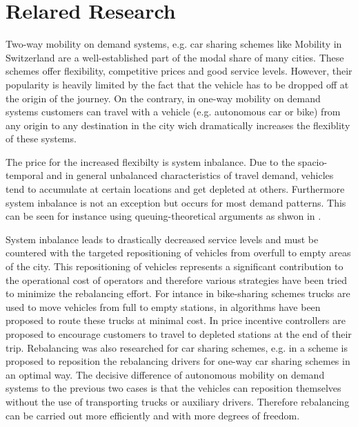 \section{Relared Research}
\label{subs:literatureResearch}

Two-way mobility on demand systems, e.g. car sharing schemes like Mobility in
Switzerland \citep{katzev2003car} are a well-established part of the modal share
of many cities. These schemes offer flexibility, competitive prices and good
service levels. However, their popularity is heavily limited by the fact that
the vehicle has to be dropped off at the origin of the journey. On the contrary,
in one-way mobility on demand systems customers can travel with a vehicle (e.g.
autonomous car or bike) from any origin to any destination in the city wich
dramatically increases the flexiblity of these systems.

The price for the increased flexibilty is system inbalance. Due to the
spacio-temporal and in general unbalanced characteristics of travel demand,
vehicles tend to accumulate at certain locations and get depleted at others.
Furthermore system inbalance is not an exception but occurs for most demand
patterns. This can be seen for instance using queuing-theoretical arguments
as shwon in \citep{zhang2016control}.

System inbalance leads to drastically decreased service levels and must be
countered with the targeted repositioning of vehicles from overfull to empty
areas of the city. This repositioning of vehicles represents a significant
contribution to the operational cost of operators and therefore various strategies
have been tried to minimize the rebalancing effort. For intance in bike-sharing
schemes trucks are used to move vehicles from full to empty stations, in
\citep{pfrommer2014dynamic} algorithms have been proposed to route these
trucks at minimal cost. In \citep{ruch2014rule} price incentive controllers
are proposed to encourage customers to travel to depleted stations at the end
of their trip. Rebalancing was also researched for car sharing schemes, e.g.
in \citep{smith2013rebalancing} a scheme is proposed to reposition the
rebalancing drivers for one-way car sharing schemes in an optimal way. The
decisive difference of autonomous mobility on demand systems to the previous two
cases is that the vehicles can reposition themselves without the use of transporting
trucks or auxiliary drivers. Therefore rebalancing can be carried out more efficiently
and with more degrees of freedom.

